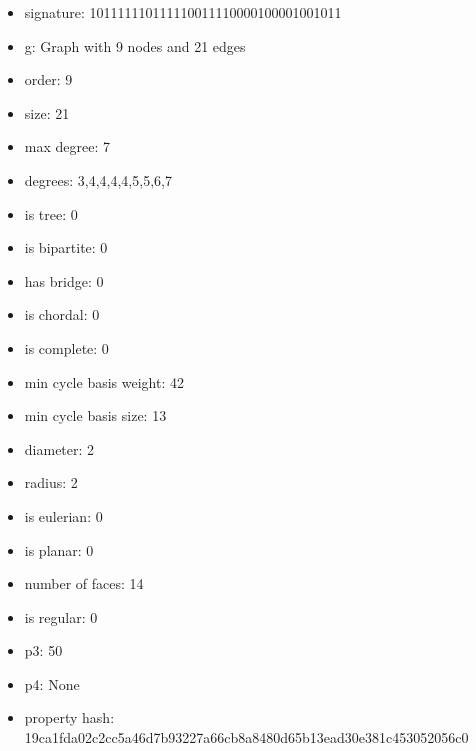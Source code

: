 \newpage
\begin{figure}
\end{figure}
\begin{itemize}
\item signature: 101111110111110011110000100001001011
\item g: Graph with 9 nodes and 21 edges
\item order: 9
\item size: 21
\item max degree: 7
\item degrees: 3,4,4,4,4,5,5,6,7
\item is tree: 0
\item is bipartite: 0
\item has bridge: 0
\item is chordal: 0
\item is complete: 0
\item min cycle basis weight: 42
\item min cycle basis size: 13
\item diameter: 2
\item radius: 2
\item is eulerian: 0
\item is planar: 0
\item number of faces: 14
\item is regular: 0
\item p3: 50
\item p4: None
\item property hash: 19ca1fda02c2cc5a46d7b93227a66cb8a8480d65b13ead30e381c453052056c0
\end{itemize}
